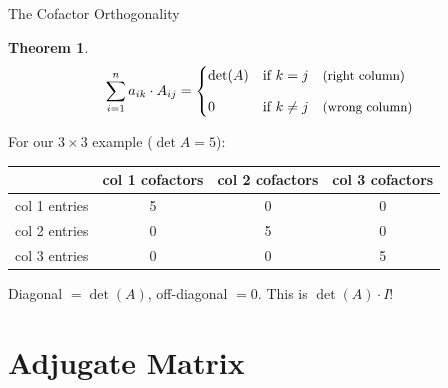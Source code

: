 \documentclass[10pt]{beamer}
\theoremstyle{definition}
\newtheorem{thm}{Theorem}[section]
\newcommand{\rd}[1]{{\color{red!70!black}#1}}
\newcommand{\bl}[1]{{\color{blue!70!black}#1}}
\newcommand{\gn}[1]{{\color{green!60!black}#1}}
\begin{document}
\begin{frame}{The Cofactor Orthogonality}

\begin{thm}
$$
\sum_{i=1}^{n} a_{ik} \cdot A_{ij} =
\begin{cases}
\det(A) & \text{if } k = j \quad \text{\small (right column)}\\[8pt]
0 & \text{if } k \neq j \quad \text{\small (wrong column)}
\end{cases}
$$
\end{thm}

\vfill

For our $3\times 3$ example ($\det A = 5$):

\begin{center}
\renewcommand{\arraystretch}{1.5}
{\small
\begin{tabular}{r|ccc}
& col 1 cofactors & col 2 cofactors & col 3 cofactors \\
\hline
col 1 entries & \rd{5} & $0$ & $0$ \\
col 2 entries & $0$ & \bl{5} & $0$ \\
col 3 entries & $0$ & $0$ & \gn{5}
\end{tabular}
}
\end{center}

\vfill

Diagonal $= \det(A)$, off-diagonal $= 0$. \quad This is $\det(A) \cdot I$\;!

\end{frame}


\section{Adjugate Matrix}
\end{document}
